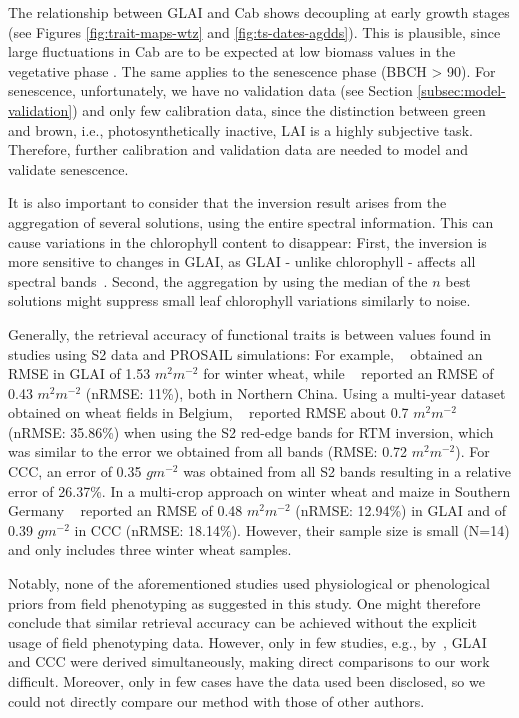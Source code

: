The relationship between \gls{GLAI} and \gls{Cab} shows decoupling at early growth stages (see Figures \ref{fig:trait-maps-wtz} and \ref{fig:ts-dates-agdds}). This is plausible, since large fluctuations in \gls{Cab} are to be expected at low biomass values in the vegetative phase \citep{lemaire_diagnosis_2008}. The same applies to the senescence phase (BBCH > 90). For senescence, unfortunately, we have no validation data (see Section \ref{subsec:model-validation}) and only few calibration data, since the distinction between green and brown, i.e., photosynthetically inactive, LAI is a highly subjective task. Therefore, further calibration and validation data are needed to model and validate senescence.

It is also important to consider that the inversion result arises from the aggregation of several solutions, using the entire spectral information. This can cause variations in the chlorophyll content to disappear: First, the inversion is more sensitive to changes in GLAI, as \gls{GLAI} - unlike chlorophyll - affects all spectral bands~\citep{verrelst_global_2017}. Second, the aggregation by using the median of the $n$ best solutions might suppress small leaf chlorophyll variations similarly to noise.

Generally, the retrieval accuracy of functional traits is between values found in studies using \gls{S2} data and PROSAIL simulations: For example, ~\cite{xie_retrieval_2019} obtained an RMSE in \gls{GLAI} of 1.53 $m^2m^{-2}$ for winter wheat, while ~\cite{pan_modeling_2019} reported an RMSE of 0.43 $m^2m^{-2}$ (nRMSE: 11\%), both in Northern China. Using a multi-year dataset obtained on wheat fields in Belgium, ~\cite{delloye_retrieval_2018} reported RMSE about 0.7 $m^2m^{-2}$ (nRMSE: 35.86\%) when using the \gls{S2} red-edge bands for \gls{RTM} inversion, which was similar to the error we obtained from all bands (RMSE: 0.72 $m^2m^{-2}$). For CCC, an error of 0.35 $gm^{-2}$ was obtained from all \gls{S2} bands resulting in a relative error of 26.37\%. In a multi-crop approach on winter wheat and maize in Southern Germany ~\cite{estevez_top--atmosphere_2021} reported an RMSE of 0.48 $m^2m^{-2}$ (nRMSE: 12.94\%) in \gls{GLAI} and of 0.39 $gm^{-2}$ in \gls{CCC} (nRMSE: 18.14\%). However, their sample size is small (N=14) and only includes three winter wheat samples.

Notably, none of the aforementioned studies used physiological or phenological priors from field phenotyping as suggested in this study. One might therefore conclude that similar retrieval accuracy can be achieved without the explicit usage of field phenotyping data. However, only in few studies, e.g., by~\cite{delloye_retrieval_2018}, \gls{GLAI} and \gls{CCC} were derived simultaneously, making direct comparisons to our work difficult. Moreover, only in few cases have the data used been disclosed, so we could not directly compare our method with those of other authors.

